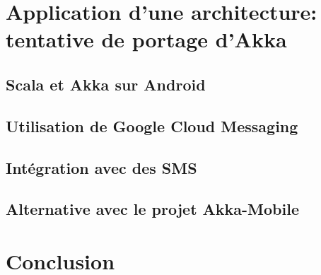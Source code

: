 \documentclass[a4paper,12pt]{article}
\begin{document}
\section{Application d'une architecture: tentative de portage d'Akka}
\subsection{Scala et Akka sur Android}
\subsection{Utilisation de Google Cloud Messaging}
\subsection{Intégration avec des SMS}
\subsection{Alternative avec le projet Akka-Mobile}
\newpage


\section*{Conclusion}
\end{document}
